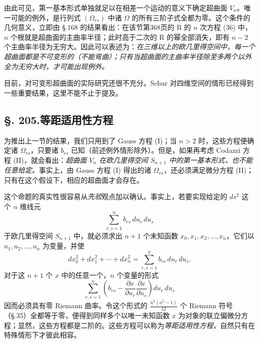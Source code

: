由此可见，第一基本形式单独就足以在相差一个运动的意义下确定超曲面 $V_n$。唯一可能的例外，是行列式 $(\Omega_{rs})$ 中诸 $\Omega$ 的所有三阶子式全都为零。这个条件的几何意义，立即由 \S.168 的结果看出：在该节第368页的 R 的 $n$ 次方程 (36) 中，$n$ 个根就是超曲面的主曲率半径；此时高于二次的 R 的幂全部消失，即有 $n-2$ 个主曲率半径为无穷大。因此可以表述为：\emph{在三维以上的欧几里得空间中，每一个超曲面都是不可变形的（不能弯曲）；只有当超曲面的主曲率半径除至多两个以外全为无穷大时，才可能出现例外。}

目前，对可变形超曲面的实际研究还很不充分。Schur 对四维空间的情形已经得到一些重要结果，这里不能不止于提及。

\subsection*{\S. 205.\quad 等距适用性方程}

为推出上一节的结果，我们只用到了 Gauss 方程 (I)；当 $n>2$ 时，这些方程便确定诸 $\Omega_{rs}$，只要诸 $b_{rs}$ 已知（前述例外情形除外）。但是，如果再考虑 Codazzi 方程 (II)，就会看出：\emph{超曲面 $V_n$ 在欧几里得空间 $S_{n+1}$ 中的第一基本形式，也不能任意给定。}事实上，由 Gauss 方程 (I) 得出的诸 $\Omega_{rs}$，还必须满足微分方程 (II)；只有在这个假设下，相应的超曲面才会存在。

这个命题的真实性很容易从\emph{先验}观点加以确认。事实上，若要实现给定的 $ds^2$ 这个 $n$ 维线元
\[
\sum_{r,s=1}^{n} b_{rs}\,du_r\,du_s
\]
于欧几里得空间 $S_{n+1}$ 中，就必须求出 $n+1$ 个未知函数 $x_0,x_1,x_2,\ldots,x_n$，它们以 $u_1,u_2,\ldots,u_n$ 为变量，并使
\[
dx_0^2+dx_1^2+\cdots+dx_n^2
=\sum_{r,s=1}^{n}b_{rs}\,du_r\,du_s.
\]
对于这 $n+1$ 个 $x$ 中的任意一个，$n$ 个变量的形式
\[
\sum_{r,s=1}^{n}\left(b_{rs}-\frac{\partial x}{\partial u_r}\frac{\partial x}{\partial u_s}\right)du_r\,du_s
\]
因而必须具有零 Riemann 曲率。令这个形式的 $\frac{n^2(n^2-1)}{12}$ 个 Riemann 符号（\S.35）全都等于零，便得到同样多个以唯一未知函数 $x$ 为对象的联立偏微分方程；显然，这些方程都是二阶的。这些方程可以称为\emph{等距适用性方程}，自然只有在特殊情形下才彼此相容。

